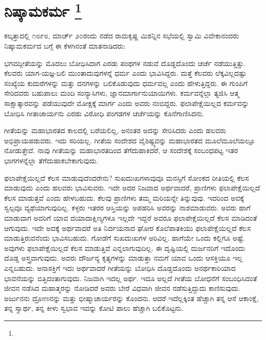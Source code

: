 
\vspace{-1cm}

\chapter[ನಿಷ್ಕಾಮಕರ್ಮ ]{ನಿಷ್ಕಾಮಕರ್ಮ \protect\footnote{}}

ಕಲ್ಕತ್ತಾದಲ್ಲಿ ೧೮೯೮, ಮಾರ್ಚ್​ ೨೦ರಂದು ನಡೆದ ರಾಮಕೃಷ್ಣ ಮಿಶನ್ನಿನ ಸಭೆಯಲ್ಲಿ ಸ್ವಾಮಿ ವಿವೇಕಾನಂದರು ನಿಷ್ಕಾಮಕರ್ಮದ ಬಗ್ಗೆ ಈ ಕೆಳಗಿನಂತೆ ಮಾತನಾಡಿದರು:

ಭಗವದ್ಗೀತೆಯನ್ನು ಮೊದಲು ಬೋಧಿಸಿದಾಗ ಎರಡು ಪಂಥಗಳ ನಡುವೆ ದೊಡ್ಡದೊಂದು ಚರ್ಚೆ ನಡೆಯುತ್ತಿತ್ತು. ಕೆಲವರು ಯಾಗ-ಯಜ್ಞ-ಬಲಿ ಮುಂತಾದುವುಗಳನ್ನೆ ಧರ್ಮ ಎಂದು ಭಾವಿಸಿದ್ದರು. ಮತ್ತೆ ಕೆಲವರು ಲೆಕ್ಕವಿಲ್ಲದಷ್ಟು ಸಂಖ್ಯೆಯ ಕುದುರೆಗಳನ್ನು ಮತ್ತು ದನಗಳನ್ನು ಬಲಿಕೊಡುವುದು ಧರ್ಮವಲ್ಲ ಎಂದು ಹೇಳುತ್ತಿದ್ದರು. ಈ ಗುಂಪಿಗೆ ಸೇರಿದವರು ಬಹುಪಾಲು ಮಂದಿ ಸಂನ್ಯಾಸಿಗಳು, ಜ್ಞಾನಮಾರ್ಗಾನುಯಾಯಿಗಳು. ಕರ್ಮವನ್ನೆಲ್ಲಾ ತ್ಯಜಿಸಿ ಆತ್ಮ ಸಾಕ್ಷಾತ್ಕಾರವನ್ನು ಪಡೆಯುವುದೇ ಮೋಕ್ಷಕ್ಕೆ ಮಾರ್ಗ ಎಂದು ಅವರು ನಂಬಿದ್ದರು. ಫಲಾಪೇಕ್ಷೆಯಿಲ್ಲದ ಕರ್ಮವನ್ನು ಬೋಧಿಸಿ ಗೀತಾಚಾರ್ಯನು ಎರಡು ವಿರೋಧಿ ಪಂಗಡಗಳ ಚರ್ಚೆಯನ್ನು ಕೊನೆಗಾಣಿಸಿದನು.

ಗೀತೆಯನ್ನು ಮಹಾಭಾರತದ ಕಾಲದಲ್ಲಿ ಬರೆಯಲಿಲ್ಲ, ಅನಂತರ ಅದನ್ನು ಸೇರಿಸಿದರು ಎಂದು ಹಲವರು ಅಭಿಪ್ರಾಯಪಡುವರು. ಇದು ಸರಿಯಲ್ಲ. ಗೀತೆಯ ಸಂದೇಶದ ವೈಶಿಷ್ಟ್ಯವನ್ನು ಮಹಾಭಾರತದ ಮೂಲೆಮೂಲೆಯಲ್ಲೂ ನೋಡುತ್ತೇವೆ. ನಾವು ಗೀತೆಯನ್ನು ಮಹಾಭಾರತದಿಂದ ತೆಗೆದುಹಾಕಿದರೆ, ಆ ಸಂದೇಶಕ್ಕೆ ಸಂಬಂಧಪಟ್ಟ ಇತರ ಭಾಗಗಳನ್ನೆಲ್ಲಾ ತೆಗೆದುಹಾಕಬೇಕಾಗುವುದು.

ಫಲಾಪೇಕ್ಷೆಯಿಲ್ಲದೆ ಕೆಲಸ ಮಾಡುವುದೆಂದರೇನು? ಸುಖದುಃಖಗಳಾವುವೂ ಮನಸ್ಸಿಗೆ ಸೋಂಕದ ರೀತಿಯಲ್ಲಿ ಕೆಲಸ ಮಾಡುವುದು ಎಂದು ಹಲವರು ಭಾವಿಸುವರು. ಇದೇ ಅದರ ನಿಜವಾದ ಅರ್ಥವಾದರೆ, ಪ್ರಾಣಿಗಳು ಫಲಾಪೇಕ್ಷೆಯಿಲ್ಲದೆ ಕೆಲಸ ಮಾಡುತ್ತವೆ ಎಂದು ಹೇಳಬಹುದು. ಕೆಲವು ಪ್ರಾಣಿಗಳು ತಮ್ಮ ಮರಿಯನ್ನೇ ತಿನ್ನುವುವು. ಇದರಿಂದ ಅವಕ್ಕೆ ಸ್ವಲ್ಪವೂ ವ್ಯಥೆಯಾಗುವುದಿಲ್ಲ. ಕಳ್ಳರು ಇತರರ ಆಸ್ತಿಯನ್ನು ಅಪಹರಿಸಿ ಅವರನ್ನು ನಾಶಮಾಡುವರು. ಅವರು ಹಾಗೆ ಮಾಡುವಾಗ ಅವರಿಗೆ ಯಾವ ದಯಾದಾಕ್ಷಿಣ್ಯಗಳೂ ಇಲ್ಲದೇ ಇದ್ದರೆ ಅವರೂ ಫಲಾಪೇಕ್ಷೆಯಿಲ್ಲದೆ ಕೆಲಸ ಮಾಡಿದಂತೆ ಆಗುವುದು. ಇದೇ ಅದಕ್ಕೆ ಅರ್ಥವಾದರೆ ಅತಿ ನಿರ್ದಯನಾದ ಘೋರ ಕೊಲೆಪಾತಕಿಯು ಫಲಾಪೇಕ್ಷೆಯಿಲ್ಲದೆ ಕೆಲಸ ಮಾಡುತ್ತಿರುವನೆಂದು ಭಾವಿಸಬಹುದು. ಗೋಡೆಗೆ ಸುಖದುಃಖಗಳ ಅರಿವಿಲ್ಲ. ಹಾಗೆಯೇ ಒಂದು ಕಲ್ಲಿಗೂ ಅಷ್ಟೆ. ಅವುಗಳು ಫಲಾಪೇಕ್ಷೆಯಿಲ್ಲದೆ ಕೆಲಸ ಮಾಡುತ್ತಿವೆ ಎನ್ನಲಾಗುವುದಿಲ್ಲ. ಈ ದೃಷ್ಟಿಯಲ್ಲಿ ದುರ್ಜನರಿಗೆ ಇದೊಂದು ದೊಡ್ಡ ಅಸ್ತ್ರವಾಗುವುದು. ಅವರು ದೌರ್ಜನ್ಯ ಕೃತ್ಯಗಳನ್ನು ಮಾಡುತ್ತಾ ನಮಗೆ ಯಾವ ಒಂದು ಆಸಕ್ತಿಯೂ ಇಲ್ಲ ಎನ್ನಬಹುದು. ಅನಾಸಕ್ತಿಗೆ ಇದು ಅರ್ಥವಾದರೆ ಗೀತೆಯನ್ನು ಬೋಧಿಸಿ ದೊಡ್ಡದೊಂದು ಅನರ್ಥಕಾರಿಯಾದ ಭಾವನೆಯನ್ನು ಬಿತ್ತಿದಂತಾಗುವುದು. ನಿಜವಾಗಿ ಇದಲ್ಲ ಅರ್ಥ. ಇದೂ ಅಲ್ಲದೆ ಗೀತೆಯ ಬೋಧನೆಗೆ ಸಂಬಂಧಿಸಿದಂತೆ ಜೀವನ ನಡೆಸಿದ ಮಹಾತ್ಮರನ್ನು ನೋಡಿದರೆ ಅವರು ಬೇರೆ ವಿಧವಾಗಿ ಜೀವನ ನಡೆಸುತ್ತಿದ್ದುದು ಕಾಣಿಸುವುದು. ಅರ್ಜುನನು ದ್ರೋಣನನ್ನು ಮತ್ತು ಭೀಷ್ಮಾಚಾರ್ಯರನ್ನು ಕೊಂದನು. ಆದರೆ ಇದೆಲ್ಲಕ್ಕಿಂತ ಹೆಚ್ಚಾಗಿ ತನ್ನ ಆಸೆ ಆಕಾಂಕ್ಷೆ, ತನ್ನ ಸ್ವಾರ್ಥ, ತನ್ನ ಕೀಳು ಸ್ವಭಾವ ಇವನ್ನು ಕೋಟಿ ಪಾಲು ಹೆಚ್ಚಾಗಿ ಬಲಿಕೊಟ್ಟನು.

